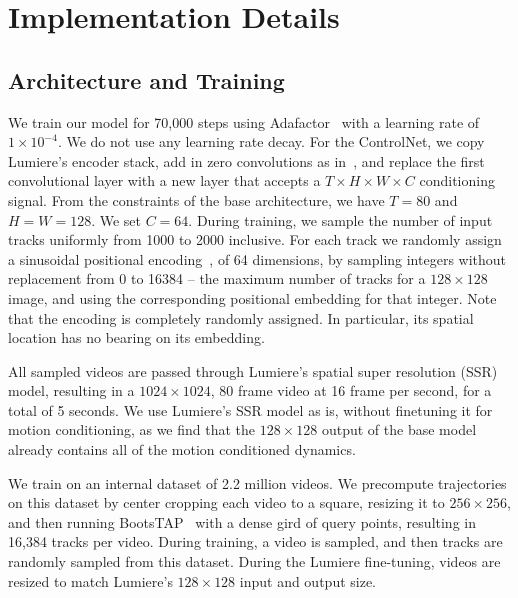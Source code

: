 \clearpage
\appendix
\setcounter{page}{1}
\maketitlesupplementary
\setcounter{figure}{0}
\renewcommand{\thefigure}{A\arabic{figure}}
\setcounter{table}{0}
\renewcommand{\thetable}{A\arabic{table}}


\section{Implementation Details}
\label{apdx:implementation}

\subsection{Architecture and Training}

We train our model for 70,000 steps using Adafactor~\cite{shazeer2018adafactor} with a learning rate of $1 \times 10^{-4}$. We do not use any learning rate decay. For the ControlNet, we copy Lumiere's encoder stack, add in zero convolutions as in~\cite{zhang2023adding}, and replace the first convolutional layer with a new layer that accepts a $T\times H \times W \times C$ conditioning signal. From the constraints of the base architecture, we have $T=80$ and $H = W = 128$. We set $C=64$. During training, we sample the number of input tracks uniformly from 1000 to 2000 inclusive. For each track we randomly assign a sinusoidal positional encoding~\cite{vaswani2017attention}, of 64 dimensions, by sampling integers without replacement from 0 to 16384 -- the maximum number of tracks for a $128 \times 128$ image, and using the corresponding positional embedding for that integer. Note that the encoding is completely randomly assigned. In particular, its spatial location has no bearing on its embedding. 


All sampled videos are passed through Lumiere's spatial super resolution (SSR) model, resulting in a $1024 \times 1024$, 80 frame video at 16 frame per second, for a total of 5 seconds. We use Lumiere's SSR model as is, without finetuning it for motion conditioning, as we find that the $128 \times 128$ output of the base model already contains all of the motion conditioned dynamics.

 We train on an internal dataset of 2.2 million videos. We precompute trajectories on this dataset by center cropping each video to a square, resizing it to $256\times 256$, and then running BootsTAP~\cite{doersch2024bootstap} with a dense gird of query points, resulting in 16,384 tracks per video.  During training, a video is sampled, and then tracks are randomly sampled from this dataset.  During the Lumiere fine-tuning, videos are resized to match Lumiere's $128 \times 128$ input and output size. 


